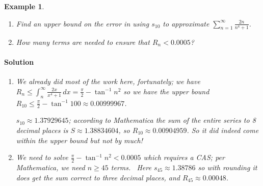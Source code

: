 \documentclass[letterpaper, 11pt, openany]{book}
\theoremstyle{mytheoremstyle}
\theoremstyle{myexamplestyle}
\newtheorem{example}{Example}[section]
\newenvironment{solution}{\paragraph{\sffamily \smaller \fontseries{b}\selectfont Solution}}{\hfill\faSquare}
\begin{document}
\begin{example}\label{e:seriesinttestestsum}
    \begin{enumerate}
        \item Find an upper bound on the error in using $s_{10}$ to approximate $\displaystyle \sum_{n=1}^{\infty} \frac{2n}{n^{4} + 1}$.
        \item How many terms are needed to ensure that \(R_n < 0.0005\)? 
    \end{enumerate}     
   
   \begin{solution}
    \begin{enumerate}
        \item  We already did most of the work here, fortunately; we have $\displaystyle R_{n} \leq \int_{n}^{\infty} \frac{2x}{x^{4} + 1} \, dx = \frac{\pi}{2} - \tan^{-1} n^{2}$ so we have the upper bound $R_{10} \leq \frac{\pi}{2} - \tan^{-1} 100 \approx 0.00999967$.
    
        $s_{10} \approx 1.37929645$; according to Mathematica the sum of the entire series to 8 decimal places is $S \approx 1.38834604$, so $R_{10} \approx 0.00904959$. So it did indeed come within the upper bound but not by much!

        \item We need to solve \(\frac{\pi}{2} - \tan^{-1} n^{2} < 0.0005\) which requires a CAS; per Mathematica, we need \(n \geq 45\) terms. \faMeh \ Here \(s_{45} \approx 1.38786\) so with rounding it does get the sum correct to three decimal places, and \(R_{45} \approx 0.00048\).
    \end{enumerate}     
   \end{solution}
\end{example}
\end{document}
